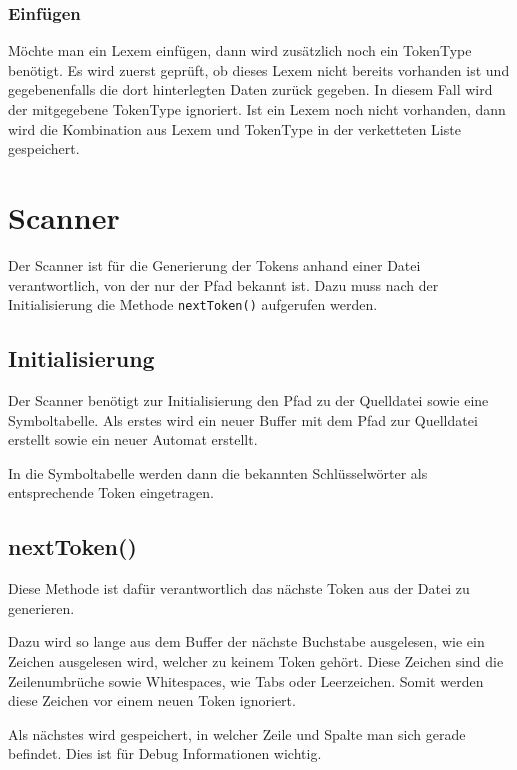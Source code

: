 \documentclass[listof=totoc,DIV11,a4paper]{scrreprt}
\begin{document}
\subsubsection{Einfügen}
Möchte man ein Lexem einfügen, dann wird zusätzlich noch ein TokenType benötigt.
Es wird zuerst geprüft, ob dieses Lexem nicht bereits vorhanden ist und gegebenenfalls die dort hinterlegten Daten zurück gegeben. In diesem Fall wird der mitgegebene TokenType ignoriert.
Ist ein Lexem noch nicht vorhanden, dann wird die Kombination aus Lexem und TokenType in der verketteten Liste gespeichert.

\section{Scanner}\label{sec:scanner_bin}
Der Scanner ist für die Generierung der Tokens anhand einer Datei verantwortlich, von der nur der Pfad bekannt ist. Dazu muss nach der Initialisierung die Methode \verb+nextToken()+ aufgerufen werden.

\subsection{Initialisierung}
Der Scanner benötigt zur Initialisierung den Pfad zu der Quelldatei sowie eine Symboltabelle. Als erstes wird ein neuer Buffer mit dem Pfad zur Quelldatei erstellt sowie ein neuer Automat erstellt.

In die Symboltabelle werden dann die bekannten Schlüsselwörter als entsprechende Token eingetragen.

\subsection{nextToken()}
Diese Methode ist dafür verantwortlich das nächste Token aus der Datei zu generieren.

Dazu wird so lange aus dem Buffer der nächste Buchstabe ausgelesen, wie ein Zeichen ausgelesen wird, welcher zu keinem Token gehört. Diese Zeichen sind die Zeilenumbrüche sowie Whitespaces, wie Tabs oder Leerzeichen. Somit werden diese Zeichen vor einem neuen Token ignoriert.

Als nächstes wird gespeichert, in welcher Zeile und Spalte man sich gerade befindet. Dies ist für Debug Informationen wichtig.
\end{document}
